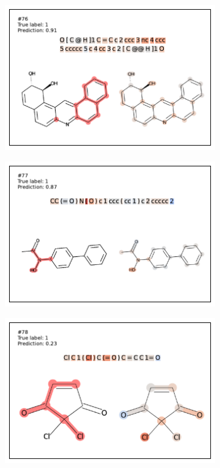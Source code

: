 \begin{figure}
\begin{subfigure}[b]{0.33\textwidth}
\end{subfigure} 
\begin{subfigure}[b]{0.33\textwidth} 
  \centering 
  \includegraphics[width=\textwidth]{figures/ames/ames76.pdf} 
\end{subfigure}\begin{subfigure}[b]{0.33\textwidth} 
  \centering 
  \includegraphics[width=\textwidth]{figures/ames/ames77.pdf} 
\end{subfigure}\begin{subfigure}[b]{0.33\textwidth} 
  \centering 
  \includegraphics[width=\textwidth]{figures/ames/ames78.pdf} 

\end{subfigure}
\end{figure}
